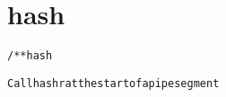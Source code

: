 \section{hash}
\begin{shaded}
\begin{alltt}
/** hash

  Call hashr at the start of a pipe segment

\end{alltt}
\end{shaded}
